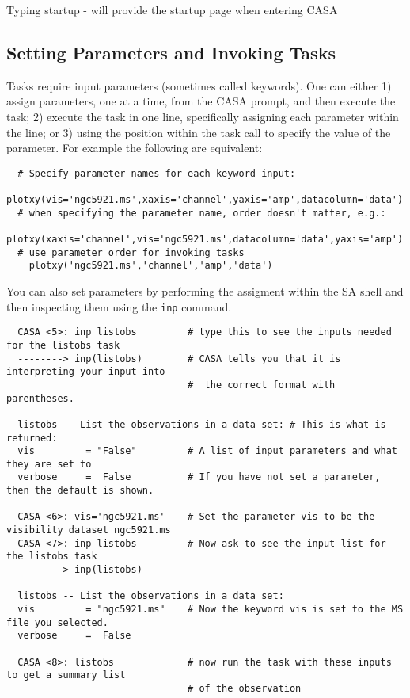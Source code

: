 Typing startup - will provide the startup page when entering CASA

\subsection{Setting Parameters and Invoking Tasks}
\label{subsection:set.parms}

Tasks require input parameters (sometimes called keywords).  One can
either 1) assign parameters, one at a time, from the CASA prompt, and
then execute the task; 2) execute the task in one line, specifically
assigning each parameter within the line; or 3) using the position
within the task call to specify the value of the parameter.  For
example the following are equivalent:

\small
\begin{verbatim}
  # Specify parameter names for each keyword input: 
    plotxy(vis='ngc5921.ms',xaxis='channel',yaxis='amp',datacolumn='data')
  # when specifying the parameter name, order doesn't matter, e.g.:
    plotxy(xaxis='channel',vis='ngc5921.ms',datacolumn='data',yaxis='amp')
  # use parameter order for invoking tasks
    plotxy('ngc5921.ms','channel','amp','data')
\end{verbatim}
\normalsize

You can also set parameters by performing the assigment within the
SA shell and then inspecting them using the {\tt inp} command. 

\small
\begin{verbatim}
  CASA <5>: inp listobs         # type this to see the inputs needed for the listobs task
  --------> inp(listobs)        # CASA tells you that it is interpreting your input into
                                #  the correct format with parentheses.  

  listobs -- List the observations in a data set: # This is what is returned: 
  vis         = "False"         # A list of input parameters and what they are set to
  verbose     =  False          # If you have not set a parameter, then the default is shown. 

  CASA <6>: vis='ngc5921.ms'    # Set the parameter vis to be the visibility dataset ngc5921.ms
  CASA <7>: inp listobs         # Now ask to see the input list for the listobs task
  --------> inp(listobs)

  listobs -- List the observations in a data set:
  vis         = "ngc5921.ms"    # Now the keyword vis is set to the MS file you selected.  
  verbose     =  False

  CASA <8>: listobs             # now run the task with these inputs to get a summary list
                                # of the observation 
\end{verbatim}
\normalsize

